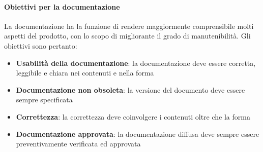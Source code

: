 \documentclass[12pt,a4paper]{article}
\begin{document}
\paragraph{Obiettivi per la documentazione}
La documentazione ha la funzione di rendere maggiormente comprensibile molti aspetti del prodotto, con lo scopo di migliorante il grado di manutenibilità. Gli obiettivi sono pertanto:
\begin{itemize}
	\item\textbf{Usabilità della documentazione}: la documentazione deve essere corretta, leggibile e chiara nei contenuti e nella forma
	\item\textbf{Documentazione non obsoleta}: la versione del documento deve essere sempre specificata
	\item\textbf{Correttezza}: la correttezza deve coinvolgere i contenuti oltre che la forma
	\item\textbf{Documentazione approvata}: la documentazione diffusa deve sempre essere preventivamente verificata ed approvata
\end{itemize}
\end{document}
